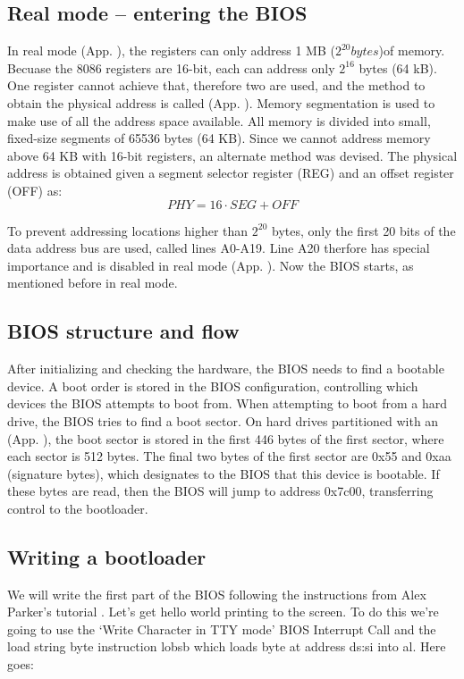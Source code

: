 \documentclass[a4paper]{article}
\begin{document}
\subsection{Real mode -- entering the BIOS}
In real mode (App. \TODO), the registers can only address 1 MB ($2^{20} bytes$)of memory. Becuase the 8086 registers are 16-bit, each can address only $2^{16}$ bytes (64 kB). One register cannot achieve that, therefore two are used, and the method to obtain the physical address is called  (App. \TODO). Memory segmentation is used to make use of all the address space available. All memory is divided into small, fixed-size segments of 65536 bytes (64 KB). Since we cannot address memory above 64 KB with 16-bit registers, an alternate method was devised. The physical address is obtained given a segment selector register (REG) and an offset register (OFF) as:
\begin{equation}
	PHY=16\cdot SEG + OFF
\end{equation}

To prevent addressing locations higher than $2^{20}$ bytes, only the first 20 bits of the data address bus are used, called lines A0-A19. Line A20 therfore has special importance and is disabled in real mode (App. \TODO). Now the BIOS starts, as mentioned before in real mode.

\subsection{BIOS structure and flow}
After initializing and checking the hardware, the BIOS needs to find a bootable device. A boot order is stored in the BIOS configuration, controlling which devices the BIOS attempts to boot from. When attempting to boot from a hard drive, the BIOS tries to find a boot sector. On hard drives partitioned with an  (App. \TODO), the boot sector is stored in the first 446 bytes of the first sector, where each sector is 512 bytes. The final two bytes of the first sector are 0x55 and 0xaa (signature bytes), which designates to the BIOS that this device is bootable. If these bytes are read, then the BIOS will jump to address 0x7c00, transferring control to the bootloader.

\subsection{Writing a bootloader}
We will write the first part of the BIOS following the instructions from Alex Parker's tutorial \cite{parkertut}.  
Let’s get hello world printing to the screen. To do this we’re going to use the ‘Write Character in TTY mode’ BIOS Interrupt Call and the load string byte instruction lobsb which loads byte at address ds:si into al. Here goes:
\end{document}
